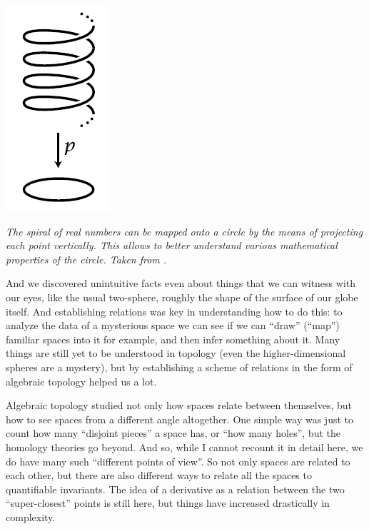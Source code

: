 \documentclass{article}
\begin{document}
\begin{center}
\includegraphics[scale=0.7]{UniversalCoveringOfCircle}

\textit{The spiral of real numbers can be mapped onto a circle by the means of projecting each point vertically. This allows to better understand various mathematical properties of the circle. Taken from \cite{NLABCIRC}.}
\end{center}


 And we discovered unintuitive facts even about things that we can witness with our eyes, like the usual two-sphere, roughly the shape of the surface of our globe itself. And establishing relations was key in understanding how to do this: to analyze the data of a mysterious space we can see if we can “draw” (“map”) familiar spaces into it for example, and then infer something about it. Many things are still yet to be understood in topology (even the higher-dimensional spheres are a mystery), but by establishing a scheme of relations in the form of algebraic topology \cite{HATCHER, MAY} helped us a lot.

Algebraic topology studied not only how spaces relate between themselves, but how to see spaces from a different angle altogether. One simple way was just to count how many “disjoint pieces” a space has, or “how many holes”, but the homology theories go beyond. And so, while I cannot recount it in detail here, we do have many such “different points of view”. So not only spaces are related to each other, but there are also different ways to relate all the spaces to quantifiable invariants. The idea of a derivative as a relation between the two “super-closest” points is still here, but things have increased drastically in complexity.
\end{document}
